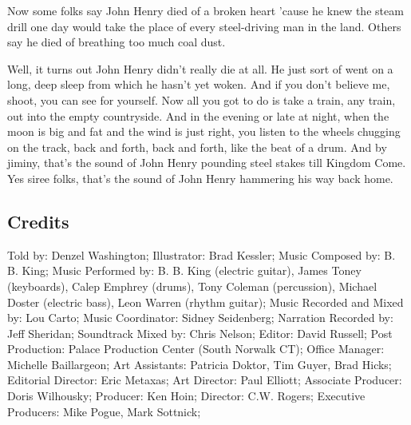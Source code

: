 Now some folks say John Henry died of a broken heart 'cause he knew the steam drill one day would take the place of every steel-driving man in the land. Others say he died of breathing too much coal dust.

Well, it turns out John Henry didn't really die at all. He just sort of went on a long, deep sleep from which he hasn't yet woken. And if you don't believe me, shoot, you can see for yourself. Now all you got to do is take a train, any train, out into the empty countryside. And in the evening or late at night, when the moon is big and fat and the wind is just right, you listen to the wheels chugging on the track, back and forth, back and forth, like the beat of a drum. And by jiminy, that's the sound of John Henry pounding steel stakes till Kingdom Come. Yes siree folks, that's the sound of John Henry hammering his way back home.

\subsection{Credits}

Told by: Denzel Washington;
Illustrator: Brad Kessler;
Music Composed by: B. B. King;
Music Performed by: B. B. King (electric guitar), James Toney (keyboards), Calep Emphrey (drums), Tony Coleman (percussion), Michael Doster (electric bass), Leon Warren (rhythm guitar);
Music Recorded and Mixed by: Lou Carto;
Music Coordinator: Sidney Seidenberg;
Narration Recorded by: Jeff Sheridan;
Soundtrack Mixed by: Chris Nelson;
Editor: David Russell;
Post Production: Palace Production Center (South Norwalk CT);
Office Manager: Michelle Baillargeon;
Art Assistants: Patricia Doktor, Tim Guyer, Brad Hicks;
Editorial Director: Eric Metaxas;
Art Director: Paul Elliott;
Associate Producer: Doris Wilhousky;
Producer: Ken Hoin;
Director: C.W. Rogers;
Executive Producers: Mike Pogue, Mark Sottnick;
